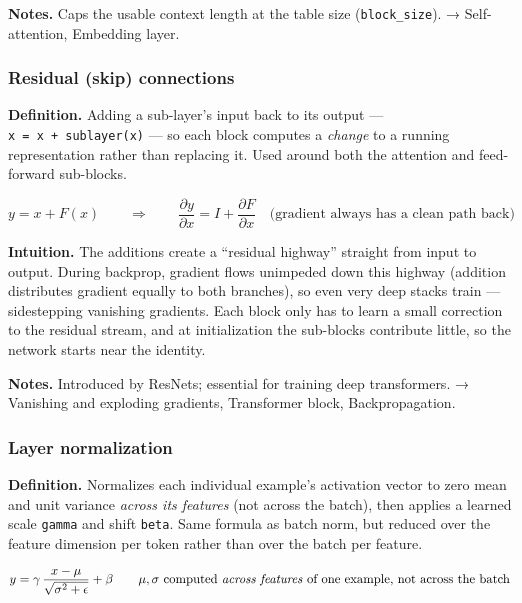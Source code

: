 \documentclass[
  10pt,
  letterpaper,
  onecolumn]{article}
\begin{document}
\textbf{Notes.} Caps the usable context length at the table size
(\texttt{block\_size}). → Self-attention, Embedding layer.

\hypertarget{residual-skip-connections}{%
\subsubsection{Residual (skip)
connections}\label{residual-skip-connections}}

\textbf{Definition.} Adding a sub-layer's input back to its output ---
\texttt{x\ =\ x\ +\ sublayer(x)} --- so each block computes a
\emph{change} to a running representation rather than replacing it. Used
around both the attention and feed-forward sub-blocks.

\begin{equation*}
y=x+F(x)
\qquad\Longrightarrow\qquad
\frac{\partial y}{\partial x}=I+\frac{\partial F}{\partial x}
\quad\text{(gradient always has a clean path back)}
\end{equation*}

\textbf{Intuition.} The additions create a ``residual highway'' straight
from input to output. During backprop, gradient flows unimpeded down
this highway (addition distributes gradient equally to both branches),
so even very deep stacks train --- sidestepping vanishing gradients.
Each block only has to learn a small correction to the residual stream,
and at initialization the sub-blocks contribute little, so the network
starts near the identity.

\textbf{Notes.} Introduced by ResNets; essential for training deep
transformers. → Vanishing and exploding gradients, Transformer block,
Backpropagation.

\hypertarget{layer-normalization}{%
\subsubsection{Layer normalization}\label{layer-normalization}}

\textbf{Definition.} Normalizes each individual example's activation
vector to zero mean and unit variance \emph{across its features} (not
across the batch), then applies a learned scale \texttt{gamma} and shift
\texttt{beta}. Same formula as batch norm, but reduced over the feature
dimension per token rather than over the batch per feature.

\begin{equation*}
y=\gamma\,\frac{x-\mu}{\sqrt{\sigma^2+\epsilon}}+\beta
\qquad \mu,\sigma \text{ computed \emph{across features} of one example, not across the batch}
\end{equation*}
\end{document}
